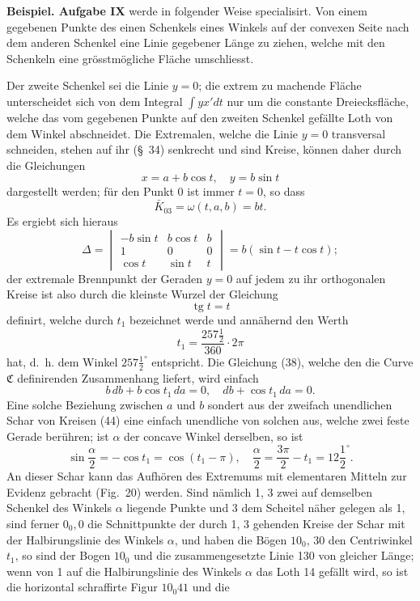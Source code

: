 \documentclass[11pt,a4paper,leqno]{article}
\newcommand{\tg}{\operatorname{tg}}
\begin{document}
\noindent\textbf{Beispiel. Aufgabe IX} werde in folgender Weise specialisirt. Von einem gegebenen Punkte des einen Schenkels eines Winkels auf der convexen Seite nach dem anderen Schenkel eine Linie gegebener Länge zu ziehen, welche mit den Schenkeln eine grösstmögliche Fläche umschliesst.

Der zweite Schenkel sei die Linie $y=0$; die extrem zu machende Fläche unterscheidet sich von dem Integral $\int yx' dt$ nur um die constante Dreiecksfläche, welche das vom gegebenen Punkte auf den zweiten Schenkel gefällte Loth von dem Winkel abschneidet. Die Extremalen, welche die Linie $y=0$ transversal schneiden, stehen auf ihr (\S~34) senkrecht und sind Kreise, können daher durch die Gleichungen
\begin{equation}\tag{44}
x=a+b\cos t,
\quad y=b\sin t
\end{equation}
dargestellt werden; für den Punkt 0 ist immer $t=0$, so dass
\[
\bar K_{03}=\omega(t,a,b)=bt.
\]
Es ergiebt sich hieraus
\[
\Delta=\begin{vmatrix}
-b\sin t&b\cos t&b\\
1&0&0\\
\cos t&\sin t&t
\end{vmatrix}=b(\sin t-t\cos t);
\]
der extremale Brennpunkt der Geraden $y=0$ auf jedem zu ihr orthogonalen Kreise ist also durch die kleinste Wurzel der Gleichung
\[
\tg t=t
\]
definirt, welche durch $t_1$ bezeichnet werde und annähernd den Werth
\[
t_1=\frac{257\frac{1}{2}}{360}\cdot 2\pi
\]
hat, d.~h. dem Winkel $257\frac{1}{2}^{\circ}$ entspricht. Die Gleichung (38), welche den die Curve $\mathfrak{C}$ definirenden Zusammenhang liefert, wird einfach
\[
b\,db+b\cos t_1\,da=0,
\quad db+\cos t_1\,da=0.
\]
Eine solche Beziehung zwischen $a$ und $b$ sondert aus der zweifach unendlichen Schar von Kreisen (44) eine einfach unendliche von solchen aus, welche zwei feste Gerade berühren; ist $\alpha$ der concave Winkel derselben, so ist
\[
\sin\frac{\alpha}{2}=-\cos t_1=\cos(t_1-\pi),
\quad \frac{\alpha}{2}=\frac{3\pi}{2}-t_1=12\frac{1}{2}^{\circ}.
\]
An dieser Schar kann das Aufhören des Extremums mit elementaren Mitteln zur Evidenz gebracht (Fig.~20) werden. Sind nämlich 1, 3 zwei auf demselben Schenkel des Winkels $\alpha$ liegende Punkte und 3 dem Scheitel näher gelegen als 1, sind ferner $0_0,0$ die Schnittpunkte der durch 1, 3 gehenden Kreise der Schar mit der Halbirungslinie des Winkels $\alpha$, und haben die Bögen $10_0$, 30 den Centriwinkel $t_1$, so sind der Bogen $10_0$ und die zusammengesetzte Linie 130 von gleicher Länge; wenn von 1 auf die Halbirungslinie des Winkels $\alpha$ das Loth 14 gefällt wird, so ist die horizontal schraffirte Figur $10_0 41$ und die
\end{document}
